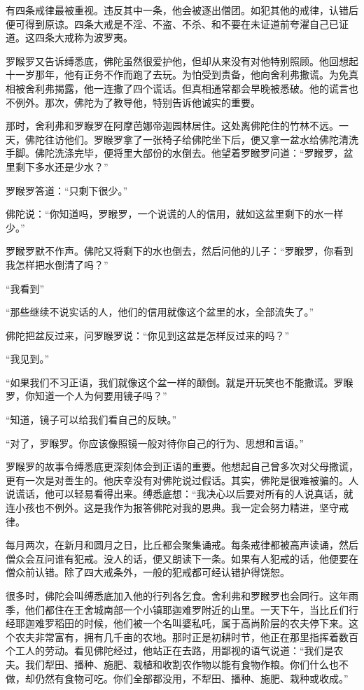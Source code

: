 \documentclass[12pt,twoside,openany]{book}
\begin{document}
有四条戒律最被重视。违反其中一条，他会被逐出僧团。如犯其他的戒律，认错后便可得到原谅。四条大戒是不淫、不盗、不杀、和不要在未证道前夸濯自己已证道。这四条大戒称为波罗夷。

罗睺罗又告诉缚悉底，佛陀虽然很爱护他，但却从来没有对他特别照顾。他回想起十一岁那年，他有正务不作而跑了去玩。为怕受到责备，他向舍利弗撒谎。为免真相被舍利弗揭露，他一连撒了四个谎话。但真相通常都会早晚被悉破。他的谎言也不例外。那次，佛陀为了教导他，特别告诉他诚实的重要。

那时，舍利弗和罗睺罗在阿摩芭娜帝迦园林居住。这处离佛陀住的竹林不远。一天，佛陀往访他们。罗睺罗拿了一张椅子给佛陀坐下后，便又拿一盆水给佛陀清洗手脚。佛陀洗涤完毕，便将里大部份的水倒去。他望着罗睺罗问道：“罗睺罗，盆里剩下多水还是少水？”

罗睺罗答道：“只剩下很少。”

佛陀说：“你知道吗，罗睺罗，一个说谎的人的信用，就如这盆里剩下的水一样少。”

罗睺罗默不作声。佛陀又将剩下的水也倒去，然后问他的儿子：“罗睺罗，你看到我怎样把水倒清了吗？”

“我看到”

“那些继续不说实话的人，他们的信用就像这个盆里的水，全部流失了。”

佛陀把盆反过来，问罗睺罗说：“你见到这盆是怎样反过来的吗？”

“我见到。”

“如果我们不习正语，我们就像这个盆一样的颠倒。就是开玩笑也不能撒谎。罗睺罗，你知道一个人为何要用镜子吗？”

“知道，镜子可以给我们看自己的反映。”

“对了，罗睺罗。你应该像照镜一般对待你自己的行为、思想和言语。”

罗睺罗的故事令缚悉底更深刻体会到正语的重要。他想起自己曾多次对父母撒谎，更有一次是对善生的。他庆幸没有对佛陀说过假话。其实，佛陀是很难被骗的。人说谎话，他可以轻易看得出来。缚悉底想：“我决心以后要对所有的人说真话，就连小孩也不例外。这是我作为报答佛陀对我的恩典。我一定会努力精进，坚守戒律。

每月两次，在新月和圆月之日，比丘都会聚集诵戒。每条戒律都被高声读诵，然后僧众会互问谁有犯戒。没人的话，便又朗读下一条。如果有人犯戒的话，他便要在僧众前认错。除了四大戒条外，一般的犯戒都可经认错护得饶恕。

很多时，佛陀会叫缚悉底加入他的行列各乞食。舍利弗和罗睺罗也会同行。这年雨季，他们都住在王舍城南部一个小镇耶迦难罗附近的山里。一天下午，当比丘们行经耶迦难罗稻田的时候，他们被一个名叫婆私吒，属于高尚阶层的农夫停下来。这个农夫非常富有，拥有几千亩的农地。那时正是初耕时节，他正在那里指挥着数百个工人的劳动。看见佛陀经过，他站正在去路，用鄙视的语气说道：“我们是农夫。我们犁田、播种、施肥、栽植和收割农作物以能有食物作粮。你们什么也不做，却仍然有食物可吃。你们全部都没用，不犁田、播种、施肥、栽种或收成。”
\end{document}
